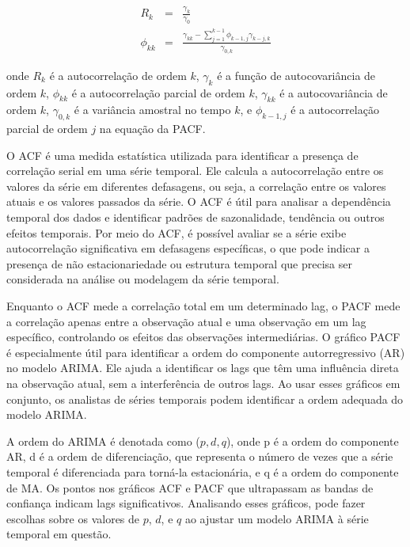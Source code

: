 \begin{eqnarray}
	 R_k &=& \frac{\gamma_k}{\gamma_0} \\ 
	 \phi_{kk} &=& \frac{\gamma_{kk} - \sum_{j=1}^{k-1} \phi_{k-1,j} \gamma_{k-j,k}}{\gamma_{0,k}}
\end{eqnarray}

\noindent onde $ R_k $ é a autocorrelação de ordem $ k $, $ \gamma_k $ é a função de autocovariância de ordem $ k $, $ \phi_{kk} $ é a autocorrelação parcial de ordem $ k $, $ \gamma_{kk} $ é a autocovariância de ordem $ k $, $ \gamma_{0,k} $ é a variância amostral no tempo $ k $, e $ \phi_{k-1,j} $ é a autocorrelação parcial de ordem $ j $ na equação da PACF.
 
 O ACF é uma medida estatística utilizada para identificar a presença de correlação serial em uma série temporal. Ele calcula a autocorrelação entre os valores da série em diferentes defasagens, ou seja, a correlação entre os valores atuais e os valores passados da série. O ACF é útil para analisar a dependência temporal dos dados e identificar padrões de sazonalidade, tendência ou outros efeitos temporais. Por meio do ACF, é possível avaliar se a série exibe autocorrelação significativa em defasagens específicas, o que pode indicar a presença de não estacionariedade ou estrutura temporal que precisa ser considerada na análise ou modelagem da série temporal.
 
 Enquanto o ACF mede a correlação total em um determinado lag, o PACF mede a correlação apenas entre a observação atual e uma observação em um lag específico, controlando os efeitos das observações intermediárias. O gráfico PACF é especialmente útil para identificar a ordem do componente autorregressivo (AR) no modelo ARIMA. Ele ajuda a identificar os lags que têm uma influência direta na observação atual, sem a interferência de outros lags. Ao usar esses gráficos em conjunto, os analistas de séries temporais podem identificar a ordem adequada do modelo ARIMA. 
 
 A ordem do ARIMA é denotada como ($p, d, q$), onde p é a ordem do componente AR, d é a ordem de diferenciação, que representa o número de vezes que a série temporal é diferenciada para torná-la estacionária, e q é a ordem do componente de MA. Os pontos nos gráficos ACF e PACF que ultrapassam as bandas de confiança indicam lags significativos. Analisando esses gráficos, pode fazer escolhas sobre os valores de $p$, $d$, e $q$ ao ajustar um modelo ARIMA à série temporal em questão. 
 
